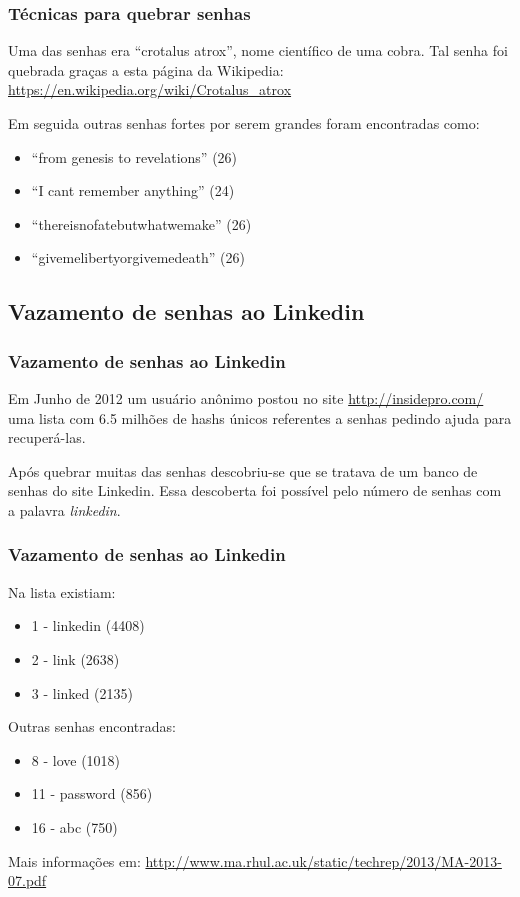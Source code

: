 \begin{frame}[fragile]\frametitle{Técnicas para quebrar senhas}

Uma das senhas era ``crotalus atrox'', nome científico de uma cobra. Tal
senha foi quebrada graças a esta página da Wikipedia:
\url{https://en.wikipedia.org/wiki/Crotalus_atrox}

Em seguida outras senhas fortes por serem grandes foram encontradas
como:

\begin{itemize}
\item
  ``from genesis to revelations'' (26)
\item
  ``I cant remember anything'' (24)
\item
  ``thereisnofatebutwhatwemake'' (26)
\item
  ``givemelibertyorgivemedeath'' (26)
\end{itemize}
\end{frame}

\subsection{Vazamento de senhas ao Linkedin}

\begin{frame}[fragile]\frametitle{Vazamento de senhas ao Linkedin}

Em Junho de 2012 um usuário anônimo postou no site
\url{http://insidepro.com/} uma lista com 6.5 milhões de hashs únicos
referentes a senhas pedindo ajuda para recuperá-las.

Após quebrar muitas das senhas descobriu-se que se tratava de um banco
de senhas do site Linkedin. Essa descoberta foi possível pelo número de
senhas com a palavra \emph{linkedin}.

\end{frame}

\begin{frame}[fragile]\frametitle{Vazamento de senhas ao Linkedin}

Na lista existiam:

\begin{itemize}
\item
  1 - linkedin (4408)
\item
  2 - link (2638)
\item
  3 - linked (2135)
\end{itemize}
Outras senhas encontradas:

\begin{itemize}
\item
  8 - love (1018)
\item
  11 - password (856)
\item
  16 - abc (750)
\end{itemize}
Mais informações em:
\url{http://www.ma.rhul.ac.uk/static/techrep/2013/MA-2013-07.pdf}

\end{frame}

